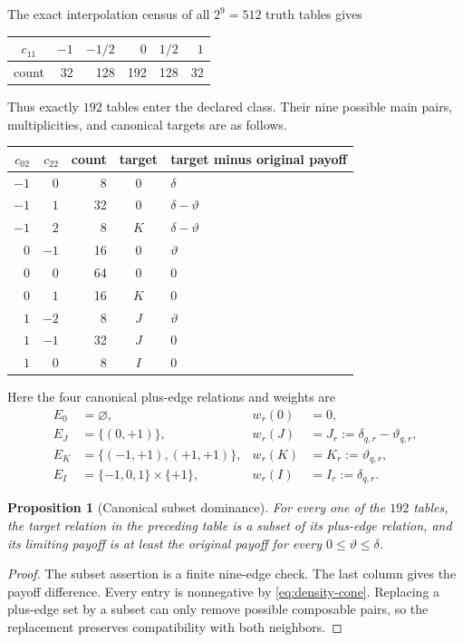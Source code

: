 \documentclass[11pt]{article}
\newtheorem{proposition}[theorem]{Proposition}
\theoremstyle{definition}
\theoremstyle{remark}
\newcommand{\TT}{\{-1,0,1\}}
\newcommand{\dd}{\delta}
\newcommand{\thh}{\vartheta}
\begin{document}
The exact interpolation census of all $2^9=512$ truth tables gives
\begin{center}
\begin{tabular}{c|rrrrr}
\toprule
$c_{11}$&$-1$&$-1/2$&$0$&$1/2$&$1$\\
\midrule
count&32&128&192&128&32\\
\bottomrule
\end{tabular}
\end{center}
Thus exactly $192$ tables enter the declared class.  Their nine possible
main pairs, multiplicities, and canonical targets are as follows.
\begin{center}
\begin{tabular}{rrrcl}
\toprule
$c_{02}$&$c_{22}$&count&target&target minus original payoff\\
\midrule
$-1$&$0$&8&$0$&$\dd$\\
$-1$&$1$&32&$0$&$\dd-\thh$\\
$-1$&$2$&8&$K$&$\dd-\thh$\\
$0$&$-1$&16&$0$&$\thh$\\
$0$&$0$&64&$0$&$0$\\
$0$&$1$&16&$K$&$0$\\
$1$&$-2$&8&$J$&$\thh$\\
$1$&$-1$&32&$J$&$0$\\
$1$&$0$&8&$I$&$0$\\
\bottomrule
\end{tabular}
\end{center}
Here the four canonical plus-edge relations and weights are
\begin{align}
 E_0&=\varnothing,&w_r(0)&=0,\nonumber\\
 E_J&=\{(0,+1)\},&w_r(J)&=J_r:=\dd_{q,r}-\thh_{q,r},\nonumber\\
 E_K&=\{(-1,+1),(+1,+1)\},&w_r(K)&=K_r:=\thh_{q,r},\nonumber\\
 E_I&=\TT\times\{+1\},&w_r(I)&=I_r:=\dd_{q,r}.
 \label{eq:canonical-relations}
\end{align}

\begin{proposition}[Canonical subset dominance]
\label{prop:subset-dominance}
For every one of the $192$ tables, the target relation in the preceding
table is a subset of its plus-edge relation, and its limiting payoff is at
least the original payoff for every $0\le\thh\le\dd$.
\end{proposition}

\begin{proof}
The subset assertion is a finite nine-edge check.  The last column gives the
payoff difference.  Every entry is nonnegative by
\eqref{eq:density-cone}.  Replacing a plus-edge set by a subset can only
remove possible composable pairs, so the replacement preserves compatibility
with both neighbors.
\end{proof}
\end{document}
